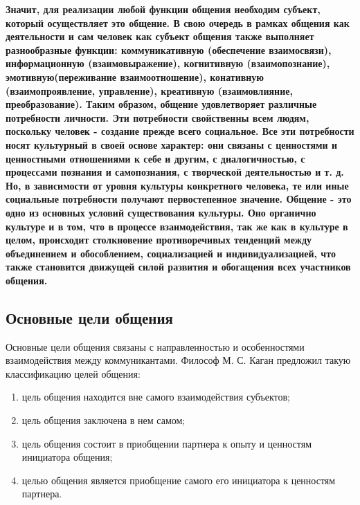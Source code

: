 {\bfseries
\textmd{Значит, для реализации любой функции общения необходим субъект, который осуществляет это общение. В свою очередь в рамках общения как деятельности и сам человек как субъект общения также выполняет разнообразные функции: коммуникативную (обеспечение взаимосвязи), информационную (взаимовыражение), когнитивную (взаимопознание), эмотивную(переживание взаимоотношение), конативную (взаимопроявление, управление), креативную (взаимовлияние, преобразование). Таким образом, общение удовлетворяет различные потребности личности. Эти потребности свойственны всем людям, поскольку человек - создание прежде всего социальное. Все эти потребности носят культурный в своей основе характер: они связаны с ценностями и ценностными отношениями к себе и другим, с диалогичностью, с процессами познания и самопознания, с творческой деятельностью и т. д. Но, в зависимости от уровня культуры конкретного человека, те или иные социальные потребности получают первостепенное значение. Общение - это одно из основных условий существования культуры. Оно органично культуре и в том, что в процессе взаимодействия, так же как в культуре в целом, происходит столкновение противоречивых тенденций между объединением и обособлением, социализацией и индивидуализацией, что также становится движущей силой развития и обогащения всех участников общения.}}

\subsection*{Основные цели общения }
 

Основные цели общения связаны с направленностью и особенностями взаимодействия между коммуникантами. Философ М. С. Каган предложил такую классификацию целей общения:

\begin{enumerate}
    \item цель общения находится вне самого взаимодействия субъектов;
    \item цель общения заключена в нем самом;
    \item цель общения состоит в приобщении партнера к опыту и ценностям инициатора общения;
    \item целью общения является приобщение самого его инициатора к ценностям партнера.
\end{enumerate}

